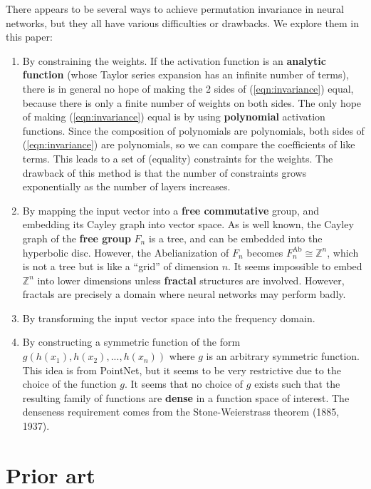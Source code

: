There appears to be several ways to achieve permutation invariance in neural networks, but they all have various difficulties or drawbacks.  We explore them in this paper:
\renewcommand{\theenumi}{(\Alph{enumi})}
\begin{enumerate}
	\item By constraining the weights.  If the activation function is an \textbf{analytic function} (whose Taylor series expansion has an infinite number of terms), there is in general no hope of making the 2 sides of (\ref{eqn:invariance}) equal, because there is only a finite number of weights on both sides.  The only hope of making (\ref{eqn:invariance}) equal is by using \textbf{polynomial} activation functions.  Since the composition of polynomials are polynomials, both sides of (\ref{eqn:invariance}) are polynomials, so we can compare the coefficients of like terms.  This leads to a set of (equality) constraints for the weights.  The drawback of this method is that the number of constraints grows exponentially as the number of layers increases.

	\item By mapping the input vector into a \textbf{free commutative} group, and embedding its Cayley graph into vector space.  As is well known, the Cayley graph of the \textbf{free group} $F_n$ is a tree, and can be embedded into the hyperbolic disc.  However, the Abelianization of $F_n$ becomes $F_n^{\text{Ab}} \cong \mathbb{Z}^n$, which is not a tree but is like a ``grid'' of dimension $n$.  It seems impossible to embed $\mathbb{Z}^n$ into lower dimensions unless \textbf{fractal} structures are involved.  However, fractals are precisely a domain where neural networks may perform badly.
	
	\item By transforming the input vector space into the frequency domain.
	
	\item By constructing a symmetric function of the form $g(h(x_1), h(x_2), ..., h(x_n))$ where $g$ is an arbitrary symmetric function.  This idea is from PointNet, but it seems to be very restrictive due to the choice of the function $g$.  It seems that no choice of $g$ exists such that the resulting family of functions are \textbf{dense} in a function space of interest.  The denseness requirement comes from the Stone-Weierstrass theorem (1885, 1937).
\end{enumerate}

\section{Prior art}

